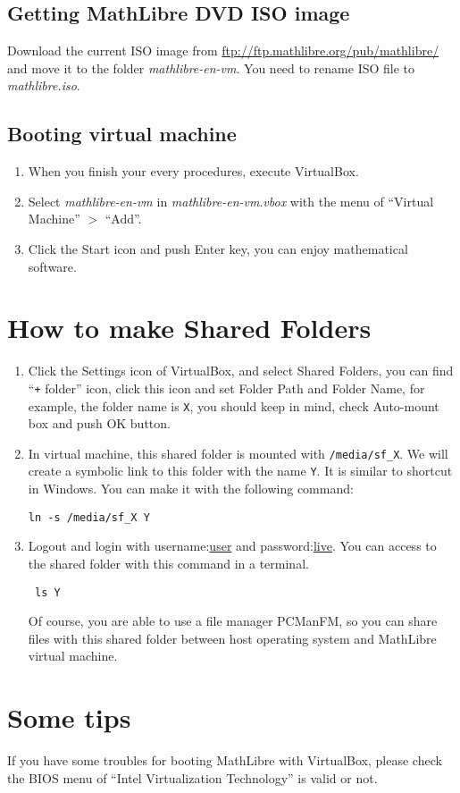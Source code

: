 \documentclass[a4]{article}
\newcommand{\vm}{{\em mathlibre-en-vm}}
\begin{document}
\subsection{Getting MathLibre DVD ISO image}
Download the current ISO image from
\url{ftp://ftp.mathlibre.org/pub/mathlibre/}
and move it to the folder \vm{}. You need to rename ISO file to {\em mathlibre.iso}.

\subsection{Booting virtual machine}
\begin{enumerate}
 \item When you finish your every procedures, execute VirtualBox.
 \item Select \vm{} in \vm.{\em vbox} with the menu of ``Virtual Machine'' $>$ ``Add''.
 \item Click the Start icon and push Enter key, you can enjoy mathematical software.
\end{enumerate}

\section{How to make Shared Folders}
\begin{enumerate}
 \item Click the Settings icon of VirtualBox,
       and select Shared Folders, you can find
       ``\verb|+| folder'' icon, click this icon and set Folder Path and
       Folder Name, for example, the folder name is \verb|X|,
       you should keep in mind, check Auto-mount box and push OK button.
 \item  In virtual machine, this shared folder is mounted with
	\verb|/media/sf_X|. We will create a symbolic link to this folder with
	the name \verb|Y|. It is similar to shortcut in Windows. You can make
	it with the following command:
\begin{lstlisting}
ln -s /media/sf_X Y
\end{lstlisting}
\item Logout and login with username:\underline{user} and password:\underline{live}. You can access to the shared folder with this command in a terminal. 
\begin{lstlisting}
 ls Y
\end{lstlisting}
Of course, you are able to use a file manager PCManFM, so you can share
files with this shared folder between host operating system and
      MathLibre virtual machine.
\end{enumerate}

\section{Some tips}
If you have some troubles for booting MathLibre with VirtualBox,
please check the BIOS menu of ``Intel Virtualization Technology'' is
valid or not.
\end{document}
